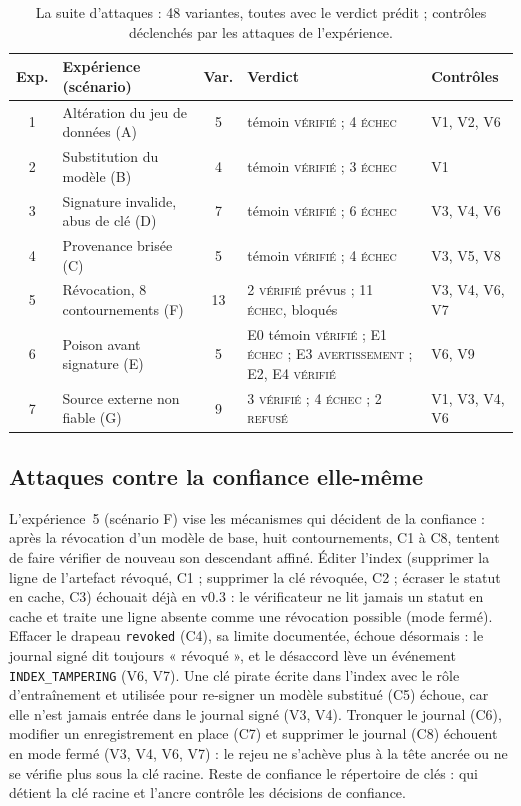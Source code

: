 \documentclass[conference]{IEEEtran}
\newcommand{\st}[1]{\textsc{#1}}
\begin{document}
\begin{table}[t]
\caption{La suite d'attaques : 48 variantes, toutes avec le verdict prédit ; contrôles déclenchés par les attaques de l'expérience.}
\label{tab:suite}
\centering
\scriptsize
\setlength{\tabcolsep}{2.5pt}
\begin{tabular}{@{}c>{\raggedright}p{2.45cm}c>{\raggedright}p{2.85cm}>{\raggedright\arraybackslash}p{1.3cm}@{}}
\toprule
Exp. & Expérience (scénario) & Var. & Verdict & Contrôles \\
\midrule
1 & Altération du jeu de données (A) & 5 & témoin \st{vérifié} ; 4 \st{échec} & V1, V2, V6 \\
2 & Substitution du modèle (B) & 4 & témoin \st{vérifié} ; 3 \st{échec} & V1 \\
3 & Signature invalide, abus de clé (D) & 7 & témoin \st{vérifié} ; 6 \st{échec} & V3, V4, V6 \\
4 & Provenance brisée (C) & 5 & témoin \st{vérifié} ; 4 \st{échec} & V3, V5, V8 \\
5 & Révocation, 8 contournements (F) & 13 & 2 \st{vérifié} prévus ; 11 \st{échec}, bloqués & V3, V4, V6, V7 \\
6 & Poison avant signature (E) & 5 & E0 témoin \st{vérifié} ; E1 \st{échec} ; E3 \st{avertissement} ; E2, E4 \st{vérifié} & V6, V9 \\
7 & Source externe non fiable (G) & 9 & 3 \st{vérifié} ; 4 \st{échec} ; 2 \st{refusé} & V1, V3, V4, V6 \\
\bottomrule
\end{tabular}
\end{table}

\subsection{Attaques contre la confiance elle-même}
L'expérience~5 (scénario F) vise les mécanismes qui décident de la confiance : après la révocation d'un modèle de base, huit contournements, C1 à C8, tentent de faire vérifier de nouveau son descendant affiné. Éditer l'index (supprimer la ligne de l'artefact révoqué, C1 ; supprimer la clé révoquée, C2 ; écraser le statut en cache, C3) échouait déjà en v0.3 : le vérificateur ne lit jamais un statut en cache et traite une ligne absente comme une révocation possible (mode fermé). Effacer le drapeau \texttt{revoked} (C4), sa limite documentée, échoue désormais : le journal signé dit toujours « révoqué », et le désaccord lève un événement \texttt{INDEX\_TAMPERING} (V6, V7). Une clé pirate écrite dans l'index avec le rôle d'entraînement et utilisée pour re-signer un modèle substitué (C5) échoue, car elle n'est jamais entrée dans le journal signé (V3, V4). Tronquer le journal (C6), modifier un enregistrement en place (C7) et supprimer le journal (C8) échouent en mode fermé (V3, V4, V6, V7) : le rejeu ne s'achève plus à la tête ancrée ou ne se vérifie plus sous la clé racine. Reste de confiance le répertoire de clés : qui détient la clé racine et l'ancre contrôle les décisions de confiance.
\end{document}
